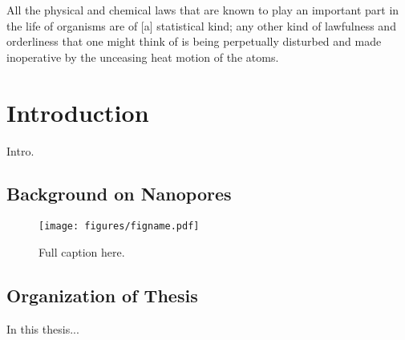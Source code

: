 \begin{savequote}[75mm]
All the physical and chemical laws that are known to play an important part in the life of organisms are of [a] statistical kind; any other kind of lawfulness and orderliness that one might think of is being perpetually disturbed and made inoperative by the unceasing heat motion of the atoms.
\end{savequote}

\chapter{Introduction}
\label{introduction}

Intro.

\section{Background on Nanopores}

\begin{figure}[h]
\begin{centering}
\texttt{[image: figures/figname.pdf]}
\caption[Brief caption]{Full caption here.}
\label{fig:Figlabel}
\end{centering}
\end{figure}

\section{Organization of Thesis}

In this thesis... \cite{Bryant1994} \cite{Vercoutere2001}